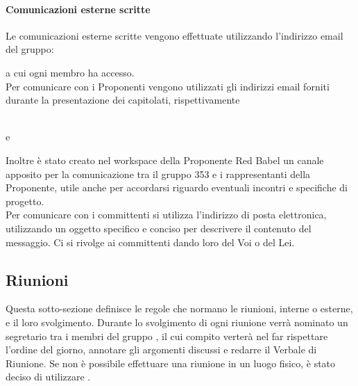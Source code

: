 \documentclass[NormeDiProgetto.tex]{subfiles}
\begin{document}
	\paragraph{Comunicazioni esterne scritte}
	Le comunicazioni esterne scritte vengono effettuate utilizzando l'indirizzo email del gruppo:
	\begin{center}
		\mailgroup
	\end{center}
	a cui ogni membro ha accesso.\\
	Per comunicare con i Proponenti vengono utilizzati gli indirizzi email forniti durante la presentazione dei capitolati, rispettivamente 
	\begin{center}
		 \\
		e\\
		
	\end{center}
	Inoltre è stato creato nel workspace  della Proponente Red Babel un canale apposito per la comunicazione tra il gruppo 353 e i rappresentanti della Proponente, utile anche per accordarsi riguardo eventuali incontri e specifiche di progetto.\\
	Per comunicare con i committenti si utilizza l'indirizzo di posta elettronica, utilizzando un oggetto specifico e conciso per descrivere il contenuto del messaggio. Ci si rivolge ai committenti dando loro del Voi o del Lei.
	
	\subsection{Riunioni}

	Questa sotto-sezione definisce le regole che normano le riunioni, interne o esterne, e il loro svolgimento. Durante lo svolgimento di ogni riunione verrà nominato un segretario tra i membri del gruppo \gruppo, il cui compito verterà nel far rispettare l'ordine del giorno, annotare gli argomenti discussi e redarre il Verbale di Riunione.
	Se non è possibile effettuare una riunione in un luogo fisico, è stato deciso di utilizzare .
\end{document}
